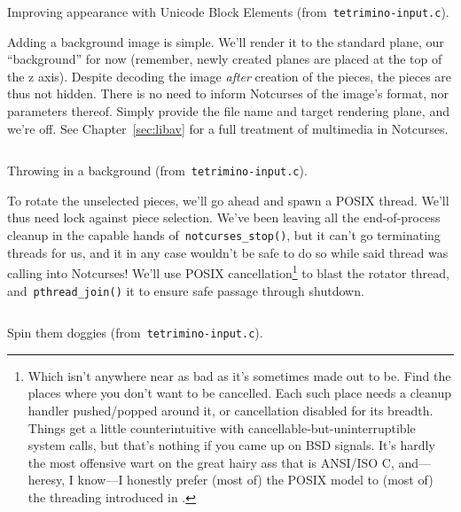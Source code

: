 \begin{listing}[!htbp]
\inputminted[]{C}{code/tetrimino-databox.h}
\begin{verbatim}

\end{verbatim}
\inputminted[]{C}{code/tetrimino-displayutf8.h}
\caption{Improving appearance with Unicode Block Elements (from~\texttt{tetrimino-input.c}).}
\label{list:tetrimino-displayutf8}
\end{listing}

Adding a background image is simple. We'll render it to the standard plane, our
``background'' for now (remember, newly created planes are placed at the top of
the z axis). Despite decoding the image \textit{after} creation of the pieces,
the pieces are thus not hidden. There is no need to inform Notcurses of the
image's format, nor parameters thereof. Simply provide the file name and target
rendering plane, and we're off. See Chapter~\ref{sec:libav} for a full treatment
of multimedia in Notcurses.

\begin{listing}[!htbp]
\inputminted[]{C}{code/tetrimino-background.h}
\caption{Throwing in a background (from~\texttt{tetrimino-input.c}).}
\label{list:tetrimino-background}
\end{listing}

To rotate the unselected pieces, we'll go ahead and spawn a POSIX thread. We'll
thus need lock against piece selection. We've been leaving all the end-of-process
cleanup in the capable hands of~\texttt{notcurses\_stop()}, but it can't go
terminating threads for us, and it in any case wouldn't be safe to do so while
said thread was calling into Notcurses! We'll use POSIX
cancellation\footnote{Which isn't anywhere near as bad as it's sometimes made out to be.
Find the places where you don't want to be cancelled. Each such place needs a
cleanup handler pushed/popped around it, or cancellation disabled for its
breadth. Things get a little counterintuitive with
cancellable-but-uninterruptible system calls, but that's nothing if you came up
on BSD signals. It's hardly the most offensive wart on the great hairy ass
that is ANSI/ISO C, and---heresy, I know---I honestly prefer (most of) the
POSIX model to (most of)
the threading introduced in .} to blast the rotator thread, and~\texttt{pthread\_join()}
it to ensure safe passage through shutdown.

\begin{listing}[!htbp]
\inputminted[]{C}{code/tetrimino-thread.h}
\caption{Spin them doggies (from~\texttt{tetrimino-input.c}).}
\label{list:tetrimino-thread}
\end{listing}

